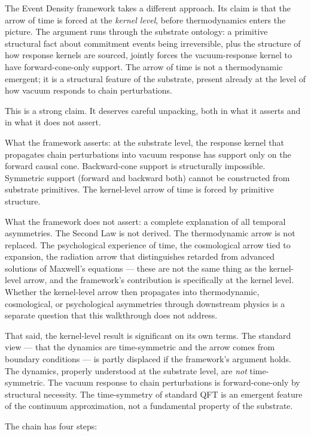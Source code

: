 \documentclass[11pt,a4paper]{article}
\begin{document}
The Event Density framework takes a different approach. Its claim is that the arrow of time is forced at the \emph{kernel level}, before thermodynamics enters the picture. The argument runs through the substrate ontology: a primitive structural fact about commitment events being irreversible, plus the structure of how response kernels are sourced, jointly forces the vacuum-response kernel to have forward-cone-only support. The arrow of time is not a thermodynamic emergent; it is a structural feature of the substrate, present already at the level of how vacuum responds to chain perturbations.

This is a strong claim. It deserves careful unpacking, both in what it asserts and in what it does not assert.

What the framework asserts: at the substrate level, the response kernel that propagates chain perturbations into vacuum response has support only on the forward causal cone. Backward-cone support is structurally impossible. Symmetric support (forward and backward both) cannot be constructed from substrate primitives. The kernel-level arrow of time is forced by primitive structure.

What the framework does not assert: a complete explanation of all temporal asymmetries. The Second Law is not derived. The thermodynamic arrow is not replaced. The psychological experience of time, the cosmological arrow tied to expansion, the radiation arrow that distinguishes retarded from advanced solutions of Maxwell's equations --- these are not the same thing as the kernel-level arrow, and the framework's contribution is specifically at the kernel level. Whether the kernel-level arrow then propagates into thermodynamic, cosmological, or psychological asymmetries through downstream physics is a separate question that this walkthrough does not address.

That said, the kernel-level result is significant on its own terms. The standard view --- that the dynamics are time-symmetric and the arrow comes from boundary conditions --- is partly displaced if the framework's argument holds. The dynamics, properly understood at the substrate level, are \emph{not} time-symmetric. The vacuum response to chain perturbations is forward-cone-only by structural necessity. The time-symmetry of standard QFT is an emergent feature of the continuum approximation, not a fundamental property of the substrate.

The chain has four steps:
\end{document}
